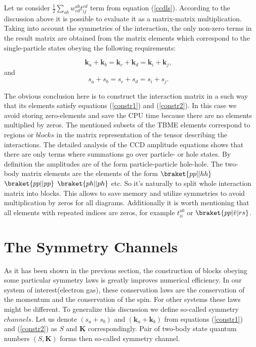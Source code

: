 \documentclass[twoside,english]{uiofysmaster}
\begin{document}
Let us consider $ \frac{1}{2}\sum_{ab}w_{cd}^{ab}t_{ij}^{cd}$ term
from equation (\ref{ccdls}). According to the discussion above it is
possible to evaluate it as a matrix-matrix multiplication. Taking into
account the symmetries of the interaction, the only non-zero terms in
the result matrix are obtained from the matrix elements which
correspond to the single-particle states obeying the following
requirements:

\begin{equation}\label{constr1}
\boldsymbol{k}_a + \boldsymbol{k}_b = \boldsymbol{k}_c + \boldsymbol{k}_d = \boldsymbol{k}_i + \boldsymbol{k}_j,
\end{equation}
and
\begin{equation}\label{constr2}
s_a + s_b = s_c + s_d = s_i + s_j.
\end{equation}

The obvious conclusion here is to construct the interaction matrix in
a such way that its elements satisfy equations (\ref{constr1}) and
(\ref{constr2}). In this case we avoid storing zero-elements and save
the CPU time because there are no elements multiplied by zeros. The
mentioned subsets of the TBME elements correspond to regions or
$blocks$ in the matrix representation of the tensor describing the
interactions.  The detailed analysis of the CCD amplitude equations
shows that there are only terms where summations go over particle- or
hole states. By definition the amplitudes are of the form
particle-particle hole-hole. The two-body matrix elements are the
elements of the form $\braket{pp||hh}$ $\braket{pp||pp}$
$\braket{ph||ph}$ etc. So it's naturally to split whole interaction
matrix into blocks. This allows to save memory and utilize symmetries
to avoid multiplication by zeros for all diagrams.  Additionally it is
worth mentioning that all elements with repeated indices are zeros,
for example $t_{ii}^{ab}$ or $\braket{pp|\hat{v}|rs}$.


\section{The Symmetry Channels}\label{sectionSymmetryChan}
As it has been shown in the previous section, the construction of blocks
obeying some particular symmetry laws is greatly improves numerical
efficiency. In our system of interest(electron gas), these
conservation laws are the conservation of the momentum and the
conservation of the spin. For other systems these laws might be
different. To generalize this discussion we define so-called symmetry
$channels$. Let us denote $(s_a + s_b)$ and $(\boldsymbol{k}_a +
\boldsymbol{k}_b)$ from equations (\ref{constr1}) and (\ref{constr2})
as $S$ and $\boldsymbol{K}$ correspondingly. Pair of two-body state
quantum numbers $(S, \boldsymbol{K})$ forms then so-called symmetry
channel.
\end{document}
